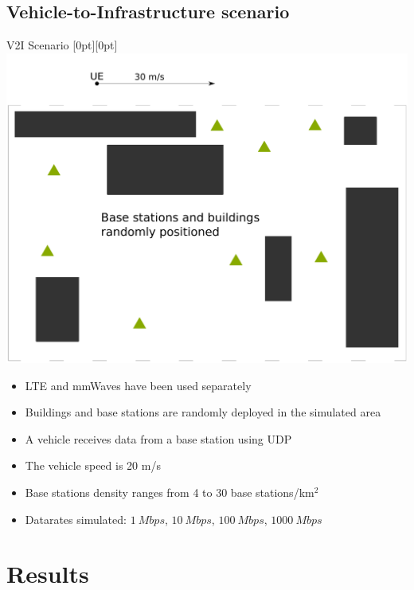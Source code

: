 \documentclass{beamer}
\newcommand{\lenitem}[2][.45\linewidth]{\parbox[t]{#1}{\strut #2\strut}}
\begin{document}
	\subsection{Vehicle-to-Infrastructure scenario}

	\begin{frame}{V2I Scenario}
		\vspace{-1cm}
		\mbox{}\hfill\raisebox{-\height}[0pt][0pt]{\includegraphics[width=.47\linewidth]{scenario}}
		\begin{itemize}
			\item \lenitem{LTE and mmWaves have been used separately}
			\item \lenitem{Buildings and base stations are randomly deployed in the simulated area} 
			\item \lenitem{A vehicle receives data from a base station using UDP\vspace{.5em}}
			\item The vehicle speed is 20 m/s
			\item Base stations density ranges from 4 to 30 base stations/km$^2$ 
			\item Datarates simulated: $1 ~Mbps$, $10 ~Mbps$, $100 ~Mbps$, $1000 ~Mbps$
		\end{itemize}
	\end{frame}


	\section{Results}
\end{document}
